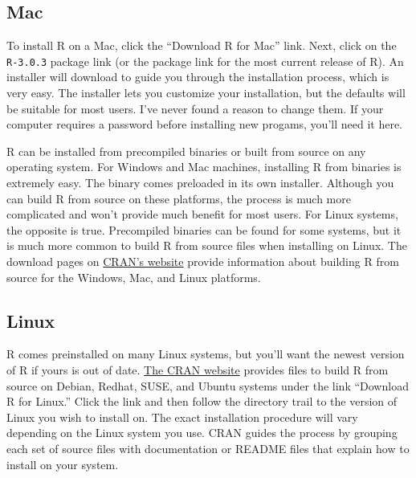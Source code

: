 \documentclass[
  letterpaper,
  DIV=11,
  numbers=noendperiod]{scrbook}
\begin{document}
\subsection{Mac}\label{mac}

To install R on a Mac, click the ``Download R for Mac'' link. Next,
click on the \texttt{R-3.0.3} package link (or the package link for the
most current release of R). An installer will download to guide you
through the installation process, which is very easy. The installer lets
you customize your installation, but the defaults will be suitable for
most users. I've never found a reason to change them. If your computer
requires a password before installing new progams, you'll need it here.

\begin{tcolorbox}[enhanced jigsaw, breakable, colback=white, colbacktitle=quarto-callout-note-color!10!white, arc=.35mm, bottomrule=.15mm, coltitle=black, left=2mm, rightrule=.15mm, colframe=quarto-callout-note-color-frame, leftrule=.75mm, opacitybacktitle=0.6, bottomtitle=1mm, toptitle=1mm, titlerule=0mm, opacityback=0, title=\textcolor{quarto-callout-note-color}{\faInfo}\hspace{0.5em}{Binaries Versus Source}, toprule=.15mm]

R can be installed from precompiled binaries or built from source on any
operating system. For Windows and Mac machines, installing R from
binaries is extremely easy. The binary comes preloaded in its own
installer. Although you can build R from source on these platforms, the
process is much more complicated and won't provide much benefit for most
users. For Linux systems, the opposite is true. Precompiled binaries can
be found for some systems, but it is much more common to build R from
source files when installing on Linux. The download pages on
\href{http://cran.r-project.org}{CRAN's website} provide information
about building R from source for the Windows, Mac, and Linux platforms.

\end{tcolorbox}

\subsection{Linux}\label{linux}

R comes preinstalled on many Linux systems, but you'll want the newest
version of R if yours is out of date.
\href{http://cran.r-project.org}{The CRAN website} provides files to
build R from source on Debian, Redhat, SUSE, and Ubuntu systems under
the link ``Download R for Linux.'' Click the link and then follow the
directory trail to the version of Linux you wish to install on. The
exact installation procedure will vary depending on the Linux system you
use. CRAN guides the process by grouping each set of source files with
documentation or README files that explain how to install on your
system.
\end{document}
